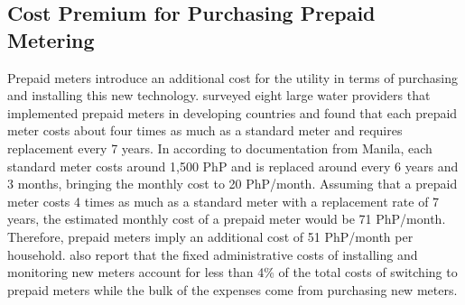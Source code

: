 \documentclass[12pt,table]{article}
\begin{document}
\subsection{Cost Premium for Purchasing Prepaid Metering}\label{appendix:prepaidcosts}

Prepaid meters introduce an additional cost for the utility in terms of purchasing and installing this new technology.  \cite{heymans2014limits} surveyed eight large water providers that implemented prepaid meters in developing countries and found that each prepaid meter costs about four times as much as a standard meter and requires replacement every 7 years.  In according to documentation from Manila, each standard meter costs around 1,500 PhP and is replaced around every 6 years and 3 months, bringing the monthly cost to 20 PhP/month.  Assuming that a prepaid meter costs 4 times as much as a standard meter with a replacement rate of 7 years, the estimated monthly cost of a prepaid meter would be 71 PhP/month.  Therefore, prepaid meters imply an additional cost of 51 PhP/month per household.  \cite{heymans2014limits} also report that the fixed administrative costs of installing and monitoring new meters account for less than 4\% of the total costs of switching to prepaid meters while the bulk of the expenses come from purchasing new meters.  
\end{document}
